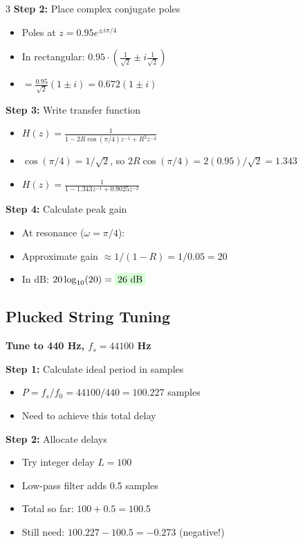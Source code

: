 \documentclass[10pt,landscape,a4paper]{article}
\newcommand{\problem}[1]{\textbf{\colorbox{cyan!15}{#1}}}
\newcommand{\answer}[1]{\colorbox{green!15}{#1}}
\begin{document}
\begin{multicols}{3}
\textbf{Step 2:} Place complex conjugate poles
\begin{itemize}
\item Poles at $z = 0.95e^{\pm i\pi/4}$
\item In rectangular: $0.95 \cdot (\frac{1}{\sqrt{2}} \pm i\frac{1}{\sqrt{2}})$
\item $= \frac{0.95}{\sqrt{2}}(1 \pm i) = 0.672(1 \pm i)$
\end{itemize}

\textbf{Step 3:} Write transfer function
\begin{itemize}
\item $H(z) = \frac{1}{1 - 2R\cos(\pi/4)z^{-1} + R^2z^{-2}}$
\item $\cos(\pi/4) = 1/\sqrt{2}$, so $2R\cos(\pi/4) = 2(0.95)/\sqrt{2} = 1.343$
\item $H(z) = \frac{1}{1 - 1.343z^{-1} + 0.9025z^{-2}}$
\end{itemize}

\textbf{Step 4:} Calculate peak gain
\begin{itemize}
\item At resonance ($\omega = \pi/4$): 
\item Approximate gain $\approx 1/(1-R) = 1/0.05 = 20$
\item In dB: $20\log_{10}(20) = \answer{26 dB}$
\end{itemize}

\subsection*{Plucked String Tuning}

\problem{Tune to 440 Hz, $f_s = 44100$ Hz}

\textbf{Step 1:} Calculate ideal period in samples
\begin{itemize}
\item $P = f_s/f_0 = 44100/440 = 100.227$ samples
\item Need to achieve this total delay
\end{itemize}

\textbf{Step 2:} Allocate delays
\begin{itemize}
\item Try integer delay $L = 100$
\item Low-pass filter adds 0.5 samples
\item Total so far: $100 + 0.5 = 100.5$
\item Still need: $100.227 - 100.5 = -0.273$ (negative!)
\end{itemize}


\end{multicols}
\end{document}
